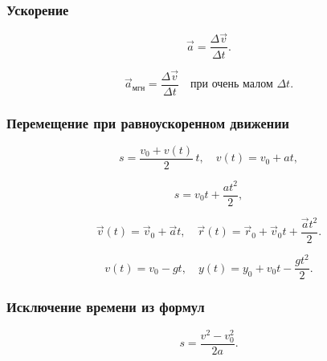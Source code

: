 \documentclass[12pt, a4paper]{article}
\begin{document}
\subsubsection*{Ускорение}

\[
\vec a = \frac{\Delta\vec v}{\Delta t}.
\]

\[
\vec a_{\text{мгн}} = \frac{\Delta\vec v}{\Delta t}\quad\text{при очень малом }\Delta t.
\]

\subsubsection*{Перемещение при равноускоренном движении}

\[
s = \frac{v_{0} + v(t)}{2}\,t, \quad v(t) = v_{0} + at,
\]

\[
s = v_{0}t + \frac{at^{2}}{2},
\]

\[
\vec v(t) = \vec v_{0} + \vec at,\quad
\vec r(t) = \vec r_{0} + \vec v_{0}t + \frac{\vec at^{2}}{2}.
\]

\[
v(t) = v_{0} - gt,\quad
y(t) = y_{0} + v_{0}t - \frac{gt^{2}}{2}.
\]

\subsubsection*{Исключение времени из формул}

\[
s = \frac{v^{2} - v_{0}^{2}}{2a}.
\]
\end{document}
